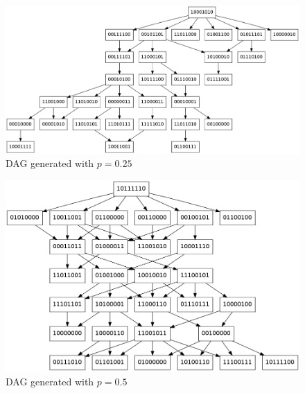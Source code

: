 \begin{figure}[H]
 \includegraphics[width = \textwidth]{./image/DagGen/output025.png}
 \caption{DAG generated with $p=0.25$} \label{DAGgen}
\end{figure}
\begin{figure}[H]
 \includegraphics[width = \textwidth]{./image/DagGen/output05.png}
 \caption{DAG generated with $p=0.5$}
\end{figure}
